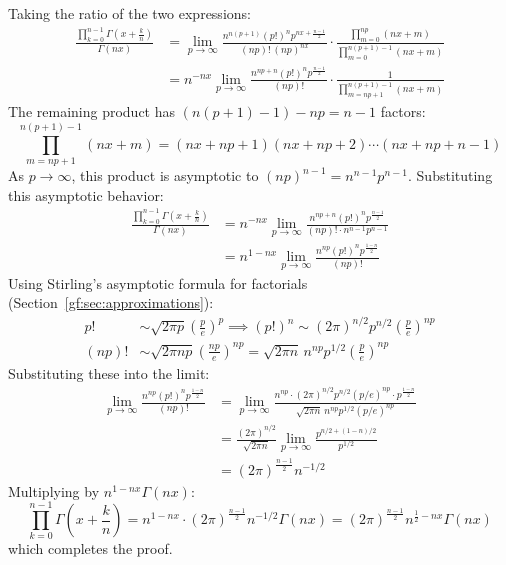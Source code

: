 \documentclass[a4paper]{article}
\begin{document}
\begin{theorem}
        Taking the ratio of the two expressions:
        \begin{align*}
            \frac{\prod_{k=0}^{n-1} \Gamma\left(x + \frac{k}{n}\right)}{\Gamma(nx)} & = \lim_{p \to \infty} \frac{n^{n(p+1)} (p!)^n p^{nx + \frac{n-1}{2}}}{(np)! \, (np)^{nx}} \cdot \frac{\prod_{m=0}^{np} (nx + m)}{\prod_{m=0}^{n(p+1)-1} (nx + m)} \\
            & = n^{-nx} \lim_{p \to \infty} \frac{n^{np+n} (p!)^n p^{\frac{n-1}{2}}}{(np)!} \cdot \frac{1}{\prod_{m=np+1}^{n(p+1)-1} (nx + m)}
        \end{align*}
        The remaining product has $(n(p+1)-1) - np = n-1$ factors:
        \begin{equation*}
            \prod_{m=np+1}^{n(p+1)-1} (nx + m) = (nx + np + 1)(nx + np + 2)\cdots(nx + np + n - 1)
        \end{equation*}
        As $p \to \infty$, this product is asymptotic to $(np)^{n-1} = n^{n-1} p^{n-1}$.
        Substituting this asymptotic behavior:
        \begin{align*}
            \frac{\prod_{k=0}^{n-1} \Gamma\left(x + \frac{k}{n}\right)}{\Gamma(nx)} & = n^{-nx} \lim_{p \to \infty} \frac{n^{np+n} (p!)^n p^{\frac{n-1}{2}}}{(np)! \cdot n^{n-1} p^{n-1}} \\
            & = n^{1-nx} \lim_{p \to \infty} \frac{n^{np} (p!)^n p^{\frac{1-n}{2}}}{(np)!}
        \end{align*}
        Using Stirling's asymptotic formula for factorials (Section~\ref{gf:sec:approximations}):
        \begin{align*}
            p! & \sim \sqrt{2\pi p} \left(\frac{p}{e}\right)^p \implies (p!)^n \sim (2\pi)^{n/2} p^{n/2} \left(\frac{p}{e}\right)^{np} \\
            (np)! & \sim \sqrt{2\pi np} \left(\frac{np}{e}\right)^{np} = \sqrt{2\pi n} \, n^{np} p^{1/2} \left(\frac{p}{e}\right)^{np}
        \end{align*}
        Substituting these into the limit:
        \begin{align*}
            \lim_{p \to \infty} \frac{n^{np} (p!)^n p^{\frac{1-n}{2}}}{(np)!} & = \lim_{p \to \infty} \frac{n^{np} \cdot (2\pi)^{n/2} p^{n/2} (p/e)^{np} \cdot p^{\frac{1-n}{2}}}{\sqrt{2\pi n} \, n^{np} p^{1/2} (p/e)^{np}} \\
            & = \frac{(2\pi)^{n/2}}{\sqrt{2\pi n}} \lim_{p \to \infty} \frac{p^{n/2 + (1-n)/2}}{p^{1/2}} \\
            & = (2\pi)^{\frac{n-1}{2}} n^{-1/2}
        \end{align*}
        Multiplying by $n^{1-nx} \Gamma(nx)$:
        \begin{equation*}
            \prod_{k=0}^{n-1} \Gamma\left(x + \frac{k}{n}\right) = n^{1-nx} \cdot (2\pi)^{\frac{n-1}{2}} n^{-1/2} \Gamma(nx) = (2\pi)^{\frac{n-1}{2}} n^{\frac{1}{2} - nx} \Gamma(nx)
        \end{equation*}
        which completes the proof.
    \end{theorem}
\end{document}
